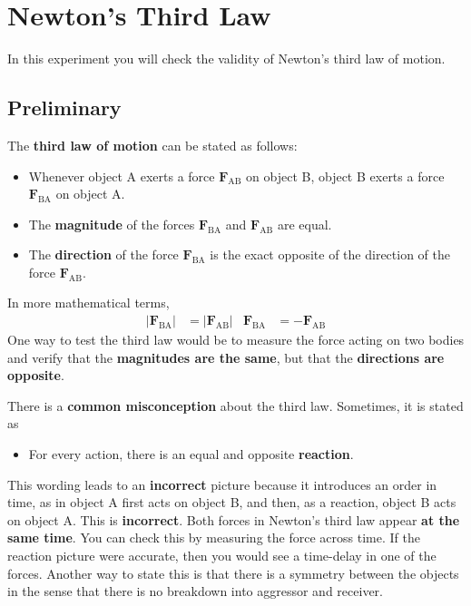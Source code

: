 \setcounter{chapter}{4}
\chapter{Newton's Third Law}
%
In this experiment you will check the validity of Newton's third law of motion.
%
\section{Preliminary}
%
The \textbf{third law of motion} can be stated as follows:
\begin{itemize}
    \item Whenever object A exerts a force $\mathbf{F}_{\text{AB}}$ on object B, object B exerts a force $\mathbf{F}_{\text{BA}}$ on object A.
    \item The \textbf{magnitude} of the forces $\mathbf{F}_{\text{BA}}$ and $\mathbf{F}_{\text{AB}}$ are equal.
    \item The \textbf{direction} of the force $\mathbf{F}_{\text{BA}}$ is the exact opposite of the direction of the force $\mathbf{F}_{\text{AB}}$.
\end{itemize}
In more mathematical terms,
\begin{align}
    \vert \mathbf{F}_{\text{BA}} \vert &= \vert \mathbf{F}_{\text{AB}} \vert & \mathbf{F}_{\text{BA}} &= - \mathbf{F}_{\text{AB}}
\end{align}
One way to test the third law would be to measure the force acting on two bodies and verify that the \textbf{magnitudes are the same}, but that the \textbf{directions are opposite}.

There is a \textbf{common misconception} about the third law. Sometimes, it is stated as
\begin{itemize}
    \item For every action, there is an equal and opposite \textbf{reaction}.
\end{itemize}
This wording leads to an \textbf{incorrect} picture because it introduces an order in time, as in object A first acts on object B, and then, as a reaction, object B acts on object A. This is \textbf{incorrect}. Both forces in Newton's third law appear \textbf{at the same time}. You can check this by measuring the force across time. If the reaction picture were accurate, then you would see a time-delay in one of the forces. Another way to state this is that there is a symmetry between the objects in the sense that there is no breakdown into aggressor and receiver.
%
